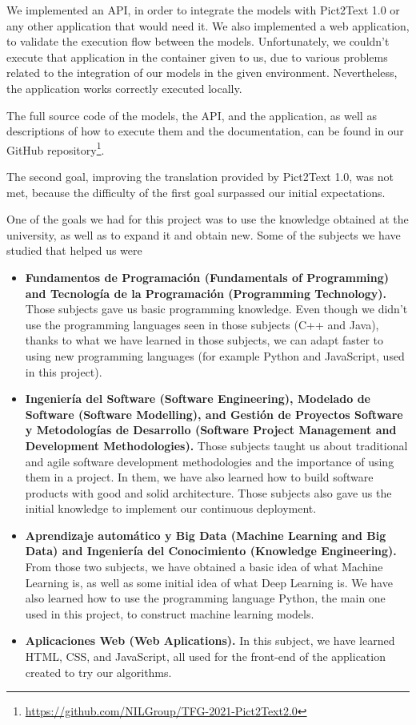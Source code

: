 We implemented an API, in order to integrate the models with Pict2Text 1.0 or any other application that would need it. We also implemented a web application, to validate the execution flow between the models. Unfortunately, we couldn't execute that application in the container given to us, due to various problems related to the integration of our models in the given environment. Nevertheless, the application works correctly executed locally.

The full source code of the models, the API, and the application, as well as descriptions of how to execute them and the documentation, can be found in our GitHub repository\footnote{\href{https://github.com/NILGroup/TFG-2021-Pict2Text2.0}{https://github.com/NILGroup/TFG-2021-Pict2Text2.0}}.

The second goal, improving the translation provided by Pict2Text 1.0, was not met, because the difficulty of the first goal surpassed our initial expectations.

One of the goals we had for this project was to use the knowledge obtained at the university, as well as to expand it and obtain new. Some of the subjects we have studied that helped us were

\begin{itemize}
\item \textbf{Fundamentos de Programaci\'{o}n (Fundamentals of Programming) and Tecnolog\'{i}a de la Programaci\'{o}n (Programming Technology).} Those subjects gave us basic programming knowledge. Even though we didn't use the programming languages seen in those subjects (C++ and Java), thanks to what we have learned in those subjects, we can adapt faster to using new programming languages (for example Python and JavaScript, used in this project).
\item \textbf{Ingenier\'{i}a del Software (Software Engineering), Modelado de Software (Software Modelling), and Gesti\'{o}n de Proyectos Software y Metodologías de Desarrollo (Software Project Management and Development Methodologies).} Those subjects taught us about traditional and agile software development methodologies and the importance of using them in a project. In them, we have also learned how to build software products with good and solid architecture. Those subjects also gave us the initial knowledge to implement our continuous deployment.
\item \textbf{Aprendizaje autom\'{a}tico y Big Data (Machine Learning and Big Data) and Ingenier\'{i}a del Conocimiento (Knowledge Engineering).} From those two subjects, we have obtained a basic idea of what Machine Learning is, as well as some initial idea of what Deep Learning is. We have also learned how to use the programming language Python, the main one used in this project, to construct machine learning models.
\item \textbf{Aplicaciones Web (Web Aplications).} In this subject, we have learned HTML, CSS, and JavaScript, all used for the front-end of the application created to try our algorithms. 
\end{itemize}

